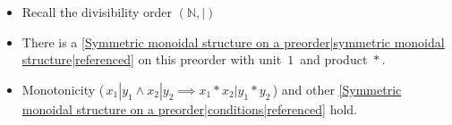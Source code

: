 
\begin{itemize}
    \item Recall the divisibility order $(\mathbb{N}, |)$
    \item There is a \ref{Symmetric monoidal structure on a preorder|symmetric monoidal structure|referenced} on this preorder with unit \,$1$\, and product \,$*$\,.
    \item  Monotonicity (\,$x_1|y_1 \land x_2|y_2 \implies x_1*x_2 | y_1*y_2$\,) and other \ref{Symmetric monoidal structure on a preorder|conditions|referenced} hold.  \end{itemize}
